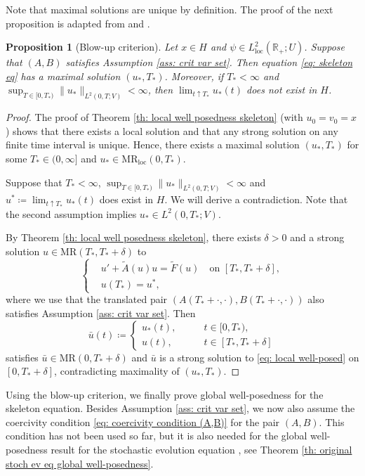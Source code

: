 \documentclass{amsart}
\renewcommand{\MR}{\mathrm{MR}}
\newcommand{\<}{\langle}
\newcommand{\?}{\rangle}
\theoremstyle{plain}
\theoremstyle{remark}
\theoremstyle{plain}
\newtheorem{proposition}[theorem]{Proposition}
\numberwithin{equation}{section}
\def\R{{\mathbb R}}
\begin{document}
Note that maximal solutions are unique by definition.
The proof of the next proposition is adapted from \cite[Th. 18.2.14, Th. 18.2.15]{HNVWvolume3} and \cite{pruss16}.

\begin{proposition}[Blow-up criterion]\label{prop: blow up criterion}
  Let $x\in H$ and $\psi\in L^2_{\mathrm{loc}}(\R_+;U)$. Suppose that $(A,B)$ satisfies Assumption \ref{ass: crit var set}. Then  equation \eqref{eq: skeleton eq} has a maximal solution $(u_*,T_*)$. Moreover, if $T_*<\infty$ and $\sup_{T\in[0,T_*)}\|u_*\|_{L^2(0,T;V)}<\infty$, then $\lim_{t\uparrow T_*}u_*(t)$ does not exist in $H$.
\end{proposition}
\begin{proof}
The proof of Theorem \ref{th: local well posedness skeleton} (with $u_0=v_0=x$) shows that there exists a local solution and that any strong solution on any finite time interval is unique. Hence, there exists a maximal solution $(u_*,T_*)$ for some $T_*\in(0,\infty]$ and $u_*\in \MR_{\mathrm{loc}}(0,T_*)$.

Suppose that $T_*<\infty$, $\sup_{T\in[0,T_*)}\|u_*\|_{L^2(0,T;V)}<\infty$ and $u^*\coloneqq \lim_{t\uparrow T_*}u_*(t)$ does exist in $H$. We will derive a contradiction. Note that the second assumption implies $u_*\in L^2(0,T_*;V)$.

By Theorem \ref{th: local well posedness skeleton}, there exists $\delta>0$ and a strong solution $u\in\MR(T_*,T_*+\delta)$ to
\begin{equation}\label{eq: loc sol in cond x}
  \begin{cases}
    &u'+\tilde{A}(u)u=\tilde{F}(u)\quad \text{on } [T_*,T_*+\delta],\\
    &u(T_*)=u^*,
  \end{cases}
\end{equation}
where we use that the translated pair $(A(T_*+\cdot,\cdot), B(T_*+\cdot,\cdot))$
also satisfies Assumption \ref{ass: crit var set}.
Then
\[
\bar{u}(t)\coloneqq   \begin{cases}
    u_*(t), \qquad &t\in [0,T_*),  \\
    u(t), &t\in [T_*,T_*+{\delta}]
  \end{cases}
\]
satisfies $\bar{u}\in \MR(0,T_*+{\delta})$ and $\bar{u}$ is a strong solution to \eqref{eq: local well-posed} on $[0,T_*+{\delta}]$, contradicting maximality of $(u_*,T_*)$.
\end{proof}

Using the blow-up criterion, we finally prove global well-posedness for the skeleton equation. Besides Assumption \ref{ass: crit var set}, we now also assume the coercivity condition \eqref{eq: coercivity condition (A,B)} for the pair $(A,B)$. This condition has not been used so far, but it is also needed for the global well-posedness result for the stochastic evolution equation \cite[Th. 3.5]{AV22variational}, see Theorem \ref{th: original stoch ev eq global well-posedness}.
\end{document}
